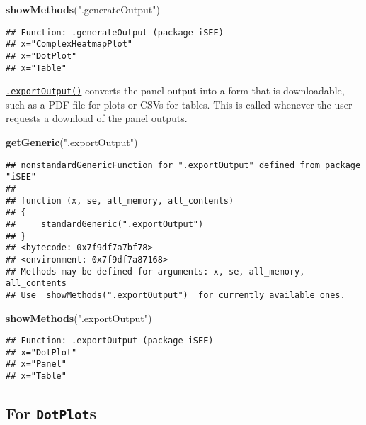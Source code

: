 \documentclass[
]{book}
\newenvironment{Shaded}{\begin{snugshade}}{\end{snugshade}}
\newcommand{\KeywordTok}[1]{\textcolor[rgb]{0.13,0.29,0.53}{\textbf{#1}}}
\newcommand{\NormalTok}[1]{#1}
\newcommand{\StringTok}[1]{\textcolor[rgb]{0.31,0.60,0.02}{#1}}
\begin{document}
\begin{Shaded}
\begin{Highlighting}[]
\KeywordTok{showMethods}\NormalTok{(}\StringTok{".generateOutput"}\NormalTok{)}
\end{Highlighting}
\end{Shaded}

\begin{verbatim}
## Function: .generateOutput (package iSEE)
## x="ComplexHeatmapPlot"
## x="DotPlot"
## x="Table"
\end{verbatim}

\href{https://isee.github.io/iSEE/reference/output-generics.html}{\texttt{.exportOutput()}} converts the panel output into a form that is downloadable, such as a PDF file for plots or CSVs for tables.
This is called whenever the user requests a download of the panel outputs.

\begin{Shaded}
\begin{Highlighting}[]
\KeywordTok{getGeneric}\NormalTok{(}\StringTok{".exportOutput"}\NormalTok{)}
\end{Highlighting}
\end{Shaded}

\begin{verbatim}
## nonstandardGenericFunction for ".exportOutput" defined from package "iSEE"
## 
## function (x, se, all_memory, all_contents) 
## {
##     standardGeneric(".exportOutput")
## }
## <bytecode: 0x7f9df7a7bf78>
## <environment: 0x7f9df7a87168>
## Methods may be defined for arguments: x, se, all_memory, all_contents
## Use  showMethods(".exportOutput")  for currently available ones.
\end{verbatim}

\begin{Shaded}
\begin{Highlighting}[]
\KeywordTok{showMethods}\NormalTok{(}\StringTok{".exportOutput"}\NormalTok{)}
\end{Highlighting}
\end{Shaded}

\begin{verbatim}
## Function: .exportOutput (package iSEE)
## x="DotPlot"
## x="Panel"
## x="Table"
\end{verbatim}

\hypertarget{for-dotplots}{%
\subsection{\texorpdfstring{For \texttt{DotPlot}s}{For DotPlots}}\label{for-dotplots}}
\end{document}
